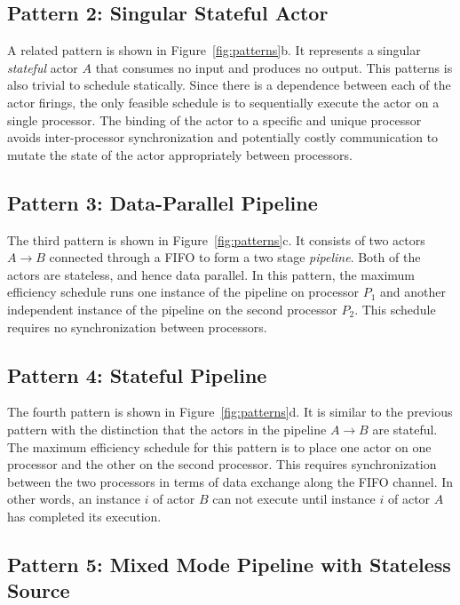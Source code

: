 \subsection{Pattern 2: Singular Stateful Actor}

A related pattern is shown in Figure~\ref{fig:patterns}b. It
represents a singular {\it stateful} actor $A$ that consumes no input
and produces no output.
This patterns is also trivial to schedule statically. Since there is a
dependence between each of the actor firings, the only feasible
schedule is to sequentially execute the actor on a single
processor. The binding of the actor to a specific and unique
processor avoids inter-processor synchronization and
potentially costly communication to mutate the state of the actor
appropriately between processors.

\subsection{Pattern 3: Data-Parallel Pipeline}

The third pattern is shown in Figure~\ref{fig:patterns}c. It consists
of two actors $A\rightarrow B$ connected through a FIFO to form a two
stage {\it pipeline}. Both of the actors are stateless, and hence data
parallel. In this pattern, the maximum efficiency schedule runs one
instance of the pipeline on processor $P_1$ and another independent
instance of the pipeline on the second processor $P_2$.  This schedule
requires no synchronization between processors.

\subsection{Pattern 4: Stateful Pipeline}

The fourth pattern is shown in Figure~\ref{fig:patterns}d. It is
similar to the previous pattern with the distinction that the actors
in the pipeline $A\rightarrow B$ are stateful. The maximum efficiency
schedule for this pattern is to place one actor on one processor and
the other on the second processor. This requires synchronization
between the two processors in terms of data exchange along the FIFO
channel. In other words, an instance $i$ of actor $B$ can not execute
until instance $i$ of actor $A$ has completed its execution.  

\subsection{Pattern 5: Mixed Mode Pipeline with Stateless Source}

